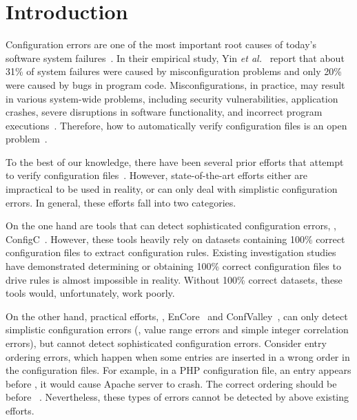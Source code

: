 \section{Introduction}
\label{sec-intro}

Configuration errors are one of the most important root causes of today's 
software system failures~\cite{xu15systems, yin11anempirical}.
In their empirical study, Yin {\em et al.}~\cite{yin11anempirical} report 
that about 31\% of system failures were caused by misconfiguration problems
and only 20\% were caused by bugs in program code. 
Misconfigurations, in practice, may result in various system-wide problems,
including security vulnerabilities, application crashes, severe disruptions
in software functionality, 
and incorrect program executions~\cite{xu15systems, xu13do, xu15hey}.  
Therefore, how to automatically verify configuration files is an open
problem~\cite{xu15systems}.

To the best of our knowledge, there have been several prior 
efforts that attempt to verify 
configuration files~\cite{santolucitoCAV, xu16early,
zhang14encore, huang15confvalley}.
However, state-of-the-art efforts either are impractical to be used
in reality, or can only deal with simplistic configuration errors.
In general, these efforts fall into two categories.

\squishlist

\item On the one hand are tools that can detect sophisticated 
configuration errors, \eg, ConfigC~\cite{santolucitoCAV}. 
However, these tools heavily rely on datasets containing 100\% 
correct configuration files to extract configuration rules.
Existing investigation studies~\cite{wang04automatic, yin11anempirical}
have demonstrated determining or obtaining 100\% correct configuration
files to drive rules is almost impossible in reality. 
Without 100\% correct datasets, these tools would, unfortunately, 
work poorly.

\item On the other hand, practical efforts, 
\eg, EnCore~\cite{zhang14encore} and
ConfValley~\cite{huang15confvalley}, can only 
detect simplistic configuration errors (\eg, value range errors 
and simple integer correlation errors), but cannot detect
sophisticated configuration errors. 
Consider entry ordering errors, 
which happen when some entries are inserted in a wrong order
in the configuration files. 
For example, in a PHP configuration file, 
an entry  appears 
before ,  
it would cause Apache server to crash. The correct ordering 
should be  before 
~\cite{yin11anempirical}.
Nevertheless, these types of errors cannot be detected by above existing
efforts.

